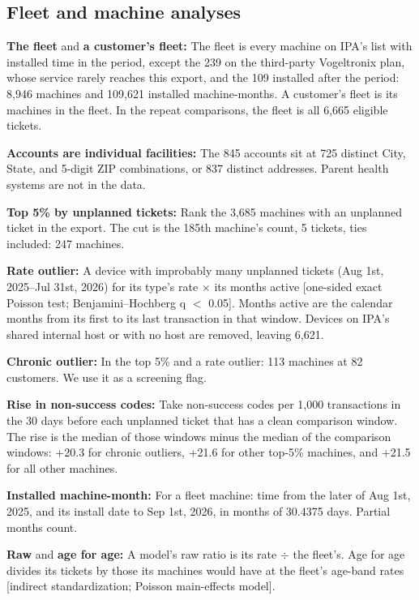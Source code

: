 \subsection*{Fleet and machine analyses}
\begin{ipadefs}
\item \textbf{The fleet} and \textbf{a customer's fleet:} The fleet is every machine on IPA's list with installed time in the period, except the 239 on the third-party Vogeltronix plan, whose service rarely reaches this export, and the 109 installed after the period: 8,946 machines and 109,621 installed machine-months. A customer's fleet is its machines in the fleet. In the repeat comparisons, the fleet is all 6,665 eligible tickets.
\item \textbf{Accounts are individual facilities:} The 845 accounts sit at 725 distinct City, State, and 5-digit ZIP combinations, or 837 distinct addresses. Parent health systems are not in the data.
\item \textbf{Top 5\% by unplanned tickets:} Rank the 3,685 machines with an unplanned ticket in the export. The cut is the 185th machine's count, 5 tickets, ties included: 247 machines.
\item \textbf{Rate outlier:} A device with improbably many unplanned tickets (Aug 1st, 2025--Jul 31st, 2026) for its type's rate $\times$ its months active [one-sided exact Poisson test; Benjamini--Hochberg q $<$ 0.05]. Months active are the calendar months from its first to its last transaction in that window. Devices on IPA's shared internal host or with no host are removed, leaving 6,621.
\item \textbf{Chronic outlier:} In the top 5\% and a rate outlier: 113 machines at 82 customers. We use it as a screening flag.
\item \textbf{Rise in non-success codes:} Take non-success codes per 1,000 transactions in the 30 days before each unplanned ticket that has a clean comparison window. The rise is the median of those windows minus the median of the comparison windows: +20.3 for chronic outliers, +21.6 for other top-5\% machines, and +21.5 for all other machines.
\item \textbf{Installed machine-month:} For a fleet machine: time from the later of Aug 1st, 2025, and its install date to Sep 1st, 2026, in months of 30.4375 days. Partial months count.
\item \textbf{Raw} and \textbf{age for age:} A model's raw ratio is its rate $\div$ the fleet's. Age for age divides its tickets by those its machines would have at the fleet's age-band rates [indirect standardization; Poisson main-effects model].

\end{ipadefs}
